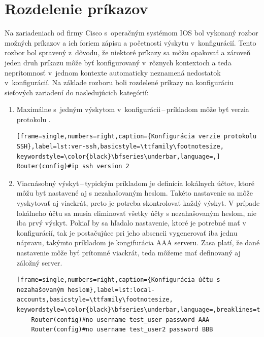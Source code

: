 \section{Rozdelenie príkazov}
Na zariadeniach od firmy Cisco s~operačným systémom IOS bol vykonaný rozbor možných príkazov a ich foriem zápisu a početnosti výskytu v~konfigurácií. Tento rozbor bol spravený z~dôvodu, že niektoré príkazy sa môžu opakovať a zároveň jeden druh príkazu môže byť konfigurovaný v~rôznych kontextoch a teda neprítomnosť v~jednom kontexte automaticky neznamená nedostatok v~konfigurácií. Na základe rozboru boli rozdelené príkazy na konfiguráciu sieťových zariadení do nasledujúcich kategórií:
\\
\begin{enumerate}
	\item Maximálne s~jedným výskytom v~konfigurácii\,--\,príkladom môže byť verzia protokolu .
	
\begin{minipage}{\linewidth}
	
\begin{lstlisting}[frame=single,numbers=right,caption={Konfigurácia verzie protokolu SSH},label=lst:ver-ssh,basicstyle=\ttfamily\footnotesize, keywordstyle=\color{black}\bfseries\underbar,language=,]
Router(config)#ip ssh version 2
\end{lstlisting}
\end{minipage}
	
	\item \vspace{2em} Viacnásobný výskyt\,--\,typickým príkladom je  definícia lokálnych účtov, ktoré môžu byť nastavené aj s nezahašovaným heslom. Takéto nastavenie sa môže vyskytovať aj viackrát, preto je potreba skontrolovať každý výskyt. V prípade lokálneho účtu sa musia eliminovať všetky účty s nezahašovaným heslom, nie iba prvý výskyt. Pokiaľ by sa hľadalo nastavenie, ktoré je potrebné mať v konfigurácií, tak je postačujúce pri jeho absencii vygenerovať iba jednu nápravu, takýmto príkladom je kongifurácia AAA serveru. Zasa platí, že dané nastavenie môže byť prítomné viackrát, teda môžeme mať definovaný aj záložný server.

\begin{minipage}{\linewidth}		
	\begin{lstlisting}[frame=single,numbers=right,caption={Konfigurácia účtu s nezahašovaným heslom},label=lst:local-accounts,basicstyle=\ttfamily\footnotesize, keywordstyle=\color{black}\bfseries\underbar,language=,breaklines=true]
	Router(config)#no username test_user password AAA
	Router(config)#no username test_user2 password BBB
	\end{lstlisting}
\end{minipage}


\end{enumerate}
